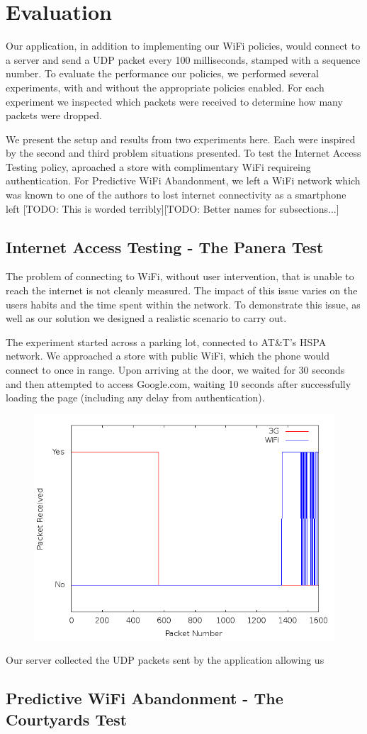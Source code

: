 \section{Evaluation}
\label{sec:eval}

Our application, in addition to implementing our WiFi policies, would connect to a server and send a UDP packet every 100 milliseconds, stamped with a sequence number. To evaluate the performance our policies, we performed several experiments, with and without the appropriate policies enabled. For each experiment we inspected which packets were received to determine how many packets were dropped.

We present the setup and results from two experiments here. Each were inspired by the second and third problem situations presented. To test the Internet Access Testing policy, aproached a store with complimentary WiFi requireing authentication. For Predictive WiFi Abandonment, we left a WiFi network which was known to one of the authors to lost internet connectivity as a smartphone left [TODO: This is worded terribly][TODO: Better names for subsections...]

\subsection{Internet Access Testing - The Panera Test}
The problem of connecting to WiFi, without user intervention, that is unable to reach the internet is not cleanly measured. The impact of this issue varies on the users habits and the time spent within the network. To demonstrate this issue, as well as our solution we designed a realistic scenario to carry out. 

The experiment started across a parking lot, connected to AT\&T's HSPA network. We approached a store with public WiFi, which the phone would connect to once in range. Upon arriving at the door, we waited for 30 seconds and then attempted to access Google.com, waiting 10 seconds after successfully loading the page (including any delay from authentication).

\begin{figure}
	\includegraphics[width=\textwidth]{paneraNoPolicy}
\end{figure}

Our server collected the UDP packets sent by the application allowing us 

\subsection{Predictive WiFi Abandonment - The Courtyards Test}